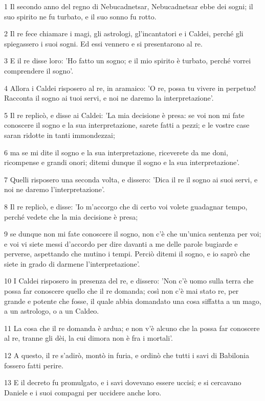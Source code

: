 \par 1 Il secondo anno del regno di Nebucadnetsar, Nebucadnetsar ebbe dei sogni; il suo spirito ne fu turbato, e il suo sonno fu rotto.
\par 2 Il re fece chiamare i magi, gli astrologi, gl'incantatori e i Caldei, perché gli spiegassero i suoi sogni. Ed essi vennero e si presentarono al re.
\par 3 E il re disse loro: 'Ho fatto un sogno; e il mio spirito è turbato, perché vorrei comprendere il sogno'.
\par 4 Allora i Caldei risposero al re, in aramaico: 'O re, possa tu vivere in perpetuo! Racconta il sogno ai tuoi servi, e noi ne daremo la interpretazione'.
\par 5 Il re replicò, e disse ai Caldei: 'La mia decisione è presa: se voi non mi fate conoscere il sogno e la sua interpretazione, sarete fatti a pezzi; e le vostre case saran ridotte in tanti immondezzai;
\par 6 ma se mi dite il sogno e la sua interpretazione, riceverete da me doni, ricompense e grandi onori; ditemi dunque il sogno e la sua interpretazione'.
\par 7 Quelli risposero una seconda volta, e dissero: 'Dica il re il sogno ai suoi servi, e noi ne daremo l'interpretazione'.
\par 8 Il re replicò, e disse: 'Io m'accorgo che di certo voi volete guadagnar tempo, perché vedete che la mia decisione è presa;
\par 9 se dunque non mi fate conoscere il sogno, non c'è che un'unica sentenza per voi; e voi vi siete messi d'accordo per dire davanti a me delle parole bugiarde e perverse, aspettando che mutino i tempi. Perciò ditemi il sogno, e io saprò che siete in grado di darmene l'interpretazione'.
\par 10 I Caldei risposero in presenza del re, e dissero: 'Non c'è uomo sulla terra che possa far conoscere quello che il re domanda; così non c'è mai stato re, per grande e potente che fosse, il quale abbia domandato una cosa siffatta a un mago, a un astrologo, o a un Caldeo.
\par 11 La cosa che il re domanda è ardua; e non v'è alcuno che la possa far conoscere al re, tranne gli dèi, la cui dimora non è fra i mortali'.
\par 12 A questo, il re s'adirò, montò in furia, e ordinò che tutti i savi di Babilonia fossero fatti perire.
\par 13 E il decreto fu promulgato, e i savi dovevano essere uccisi; e si cercavano Daniele e i suoi compagni per uccidere anche loro.
